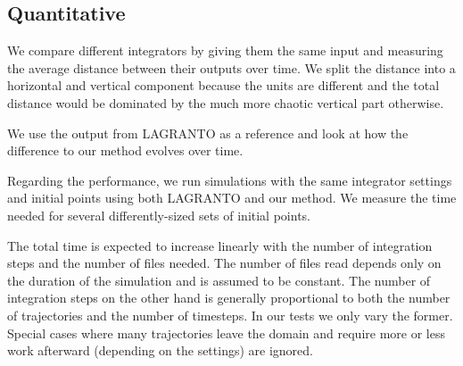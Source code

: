 \subsection{Quantitative}
We compare different integrators by giving them the same input and measuring the average distance between their outputs over time. We split the distance into a horizontal and vertical component because the units are different and the total distance would be dominated by the much more chaotic vertical part otherwise.

We use the output from LAGRANTO as a reference and look at how the difference to our method evolves over time.

Regarding the performance, we run simulations with the same integrator settings and initial points using both LAGRANTO and our method. We measure the time needed for several differently-sized sets of initial points.

The total time is expected to increase linearly with the number of integration steps and the number of files needed. The number of files read depends only on the duration of the simulation and is assumed to be constant. The number of integration steps on the other hand is generally proportional to both the number of trajectories and the number of timesteps. In our tests we only vary the former. Special cases where many trajectories leave the domain and require more or less work afterward (depending on the settings) are ignored.





